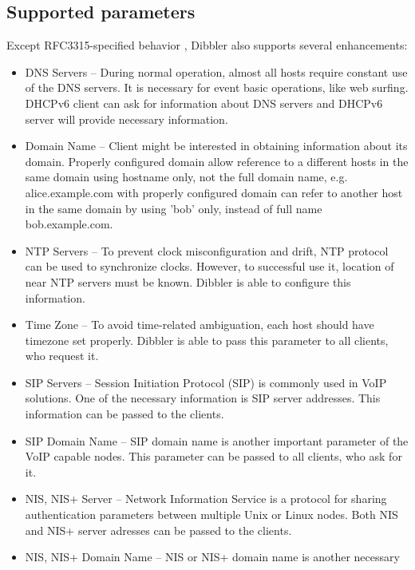 \subsection{Supported parameters}
Except RFC3315-specified behavior \cite{rfc3315}, Dibbler also supports
several enhancements:

\begin{itemize}
\item DNS Servers -- During normal operation, almost all hosts require
      constant use of the DNS servers. It is necessary for event basic
      operations, like web surfing. DHCPv6 client can ask for
      information about DNS servers and DHCPv6 server will provide
      necessary information. \cite{rfc3646}
\item Domain Name -- Client might be interested in obtaining information
      about its domain. Properly configured domain allow reference to a
      different hosts in the same domain using hostname only, not the
      full domain name, e.g. alice.example.com with properly configured
      domain can refer to another host in the same domain by using 'bob'
      only, instead of full name bob.example.com. \cite{rfc3646}
\item NTP Servers -- To prevent clock misconfiguration and drift, NTP
      protocol \cite{ntp} can be used to synchronize clocks. However, to
      successful use it, location of near NTP servers must be
      known. Dibbler is able to configure this information. \cite{draft-timezone}
\item Time Zone -- To avoid time-related ambiguation, each host should
      have timezone set properly. Dibbler is able to pass this parameter
      to all clients, who request it. \cite{draft-timezone}
\item SIP Servers -- Session Initiation Protocol (SIP) \cite{sip} is
      commonly used in VoIP solutions. One of the necessary information
      is SIP server addresses. This information can be passed to
      the clients. \cite{3319}
\item SIP Domain Name -- SIP domain name is another important parameter
      of the VoIP capable nodes. This parameter can be passed to all
      clients, who ask for it. \cite{3319}
\item NIS, NIS+ Server -- Network Information Service is a protocol for
      sharing authentication parameters between multiple Unix or Linux
      nodes. Both NIS and NIS+ server adresses can be passed to the
      clients. \cite{3898}
\item NIS, NIS+ Domain Name -- NIS or NIS+ domain name is another necessary

\end{itemize}
